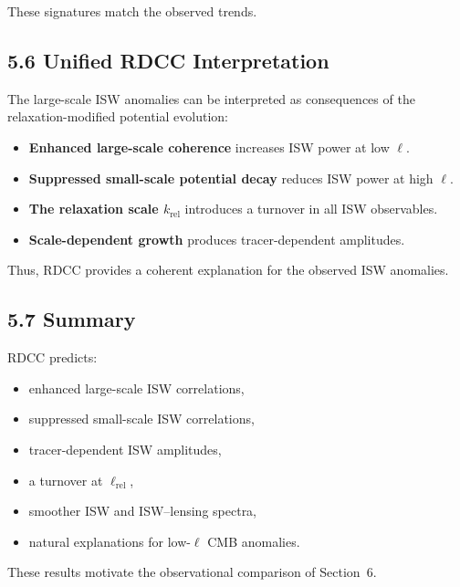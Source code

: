 \documentclass[11pt,a4paper]{article}
\begin{document}
These signatures match the observed trends.

\subsection*{5.6 Unified RDCC Interpretation}

The large-scale ISW anomalies can be interpreted as consequences of the relaxation-modified 
potential evolution:

\begin{itemize}
    \item \textbf{Enhanced large-scale coherence} increases ISW power at low $\ell$.
    \item \textbf{Suppressed small-scale potential decay} reduces ISW power at high $\ell$.
    \item \textbf{The relaxation scale $k_{\mathrm{rel}}$} introduces a turnover in all ISW observables.
    \item \textbf{Scale-dependent growth} produces tracer-dependent amplitudes.
\end{itemize}

Thus, RDCC provides a coherent explanation for the observed ISW anomalies.

\subsection*{5.7 Summary}

RDCC predicts:

\begin{itemize}
    \item enhanced large-scale ISW correlations,
    \item suppressed small-scale ISW correlations,
    \item tracer-dependent ISW amplitudes,
    \item a turnover at $\ell_{\mathrm{rel}}$,
    \item smoother ISW and ISW–lensing spectra,
    \item natural explanations for low-$\ell$ CMB anomalies.
\end{itemize}

These results motivate the observational comparison of Section~6.

\end{document}
